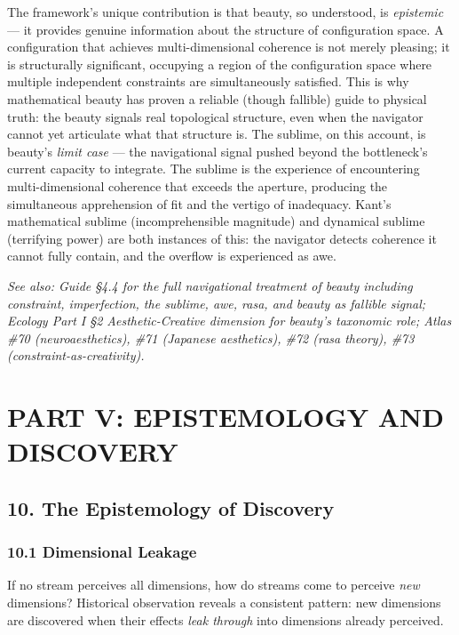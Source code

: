 The framework's unique contribution is that beauty, so understood, is \textit{epistemic} — it provides genuine information about the structure of configuration space. A configuration that achieves multi-dimensional coherence is not merely pleasing; it is structurally significant, occupying a region of the configuration space where multiple independent constraints are simultaneously satisfied. This is why mathematical beauty has proven a reliable (though fallible) guide to physical truth: the beauty signals real topological structure, even when the navigator cannot yet articulate what that structure is. The sublime, on this account, is beauty's \textit{limit case} — the navigational signal pushed beyond the bottleneck's current capacity to integrate. The sublime is the experience of encountering multi-dimensional coherence that exceeds the aperture, producing the simultaneous apprehension of fit and the vertigo of inadequacy. Kant's mathematical sublime (incomprehensible magnitude) and dynamical sublime (terrifying power) are both instances of this: the navigator detects coherence it cannot fully contain, and the overflow is experienced as awe.


\textit{See also: Guide §4.4 for the full navigational treatment of beauty including constraint, imperfection, the sublime, awe, rasa, and beauty as fallible signal; Ecology Part I §2 Aesthetic-Creative dimension for beauty's taxonomic role; Atlas \#70 (neuroaesthetics), \#71 (Japanese aesthetics), \#72 (rasa theory), \#73 (constraint-as-creativity).}


\bigskip\noindent\makebox[\textwidth]{\color{rulegray}\rule{5cm}{0.3pt}}\bigskip


\chapter*{PART V: EPISTEMOLOGY AND DISCOVERY}


\section*{10. The Epistemology of Discovery}


\subsection*{10.1 Dimensional Leakage}


If no stream perceives all dimensions, how do streams come to perceive \textit{new} dimensions? Historical observation reveals a consistent pattern: new dimensions are discovered when their effects \textit{leak through} into dimensions already perceived.


